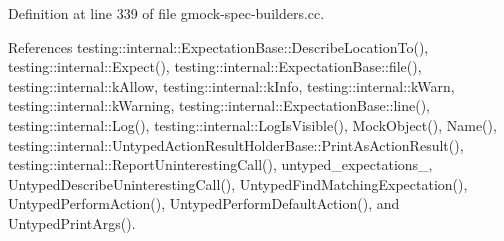 Definition at line 339 of file gmock-\/spec-\/builders.\+cc.



References testing\+::internal\+::\+Expectation\+Base\+::\+Describe\+Location\+To(), testing\+::internal\+::\+Expect(), testing\+::internal\+::\+Expectation\+Base\+::file(), testing\+::internal\+::k\+Allow, testing\+::internal\+::k\+Info, testing\+::internal\+::k\+Warn, testing\+::internal\+::k\+Warning, testing\+::internal\+::\+Expectation\+Base\+::line(), testing\+::internal\+::\+Log(), testing\+::internal\+::\+Log\+Is\+Visible(), Mock\+Object(), Name(), testing\+::internal\+::\+Untyped\+Action\+Result\+Holder\+Base\+::\+Print\+As\+Action\+Result(), testing\+::internal\+::\+Report\+Uninteresting\+Call(), untyped\+\_\+expectations\+\_\+, Untyped\+Describe\+Uninteresting\+Call(), Untyped\+Find\+Matching\+Expectation(), Untyped\+Perform\+Action(), Untyped\+Perform\+Default\+Action(), and Untyped\+Print\+Args().


